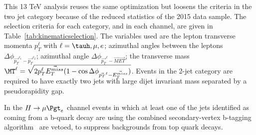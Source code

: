 This 13 TeV analysis reuses the same optimization but loosens the criteria in
the two jet category because of the reduced statistics of the 2015 data sample.
The selection criteria for each category, and in each channel, are given in Table~\ref{tab:kinematicselection}.
The variables used are the lepton transverse momenta $p_{T}^{\ell}$ with $\ell=\tauh,\mu,e$; azimuthal angles between the leptons
$\Delta \phi_{\vec{p_{T}}^{\ell_{1}}-\vec{p_{T}}^{\ell_{2}}}$;
azimuthal angle $\Delta \phi_{\vec{p_{T}}^{\ell}-\vec{MET}}$; the transverse mass
$\MT^{\ell}=\sqrt{\smash[b]{2p_{T}^{\ell}\vec{E_{T}^{miss}}(1-\cos{\Delta \phi_{\vec{p_{T}}^{\ell}-\vec{E_{T}^{miss}}}})}}$.
Events  in  the 2-jet
category are required to have exactly two jets with large dijet invariant mass separated by a pseudorapidity gap.

In the $H \rightarrow \mu \Pgt_{e}$ channel events in which at least one of the jets  identified
as coming from a b-quark decay are  using the combined secondary-vertex b-tagging
algorithm~\cite{Chatrchyan:2012jua} are vetoed, to suppress backgrounds from top quark decays.

